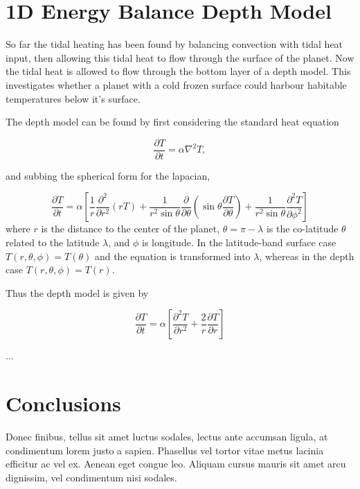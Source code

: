 \documentclass[12pt, onecolumn]{revtex4-2}    %
\begin{document}
\section{1D Energy Balance Depth Model} \label{sec:ebdmodel}

So far the tidal heating has been found by balancing convection with tidal heat input, then allowing this tidal heat to flow through the surface of the planet.
Now the tidal heat is allowed to flow through the bottom layer of a depth model.
This investigates whether a planet with a cold frozen surface could harbour habitable temperatures below it's surface.

The depth model can be found by first considering the standard heat equation

\begin{equation}
    \frac{\partial T}{\partial t} = \alpha \nabla^2 T,
\end{equation}

and subbing the spherical form for the lapacian,

\begin{equation}
    \frac{\partial T}{\partial t}  = \alpha \left[\frac{1}{r} \frac{\partial^2 }{\partial r^2} (r T)
        + \frac{1}{r^2 \sin\theta} \frac{\partial}{\partial \theta}\left(\sin\theta \frac{\partial T}{\partial\theta}\right)
        + \frac{1}{r^2 \sin\theta} \frac{\partial^2 T}{\partial \phi^2} \right]
\end{equation}
where $r$ is the distance to the center of the planet, $\theta = \pi - \lambda$ is the co-latitude $\theta$ related to the latitude $\lambda$, and $\phi$ is longitude.
In the latitude-band surface case $T(r, \theta, \phi) = T(\theta)$ and the equation is transformed into $\lambda$, whereas in the depth case $T(r, \theta, \phi) = T(r)$.

Thus the depth model is given by

\begin{equation}
    \frac{\partial T}{\partial t} = \alpha \left[\frac{\partial^2 T}{\partial r^2} + \frac{2}{r}\frac{\partial T}{\partial r}\right]
\end{equation}

...

\section{Conclusions} \label{sec:conclusion}

Donec finibus, tellus sit amet luctus sodales, lectus ante accumsan ligula, at condimentum lorem justo a sapien. Phasellus vel tortor vitae metus lacinia efficitur ac vel ex. Aenean eget congue leo. Aliquam cursus mauris sit amet arcu dignissim, vel condimentum nisi sodales.
\end{document}
